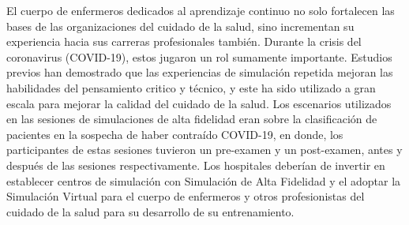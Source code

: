 El cuerpo de enfermeros dedicados al aprendizaje continuo no solo fortalecen las bases de las organizaciones del cuidado de la salud, sino incrementan su experiencia hacia sus carreras profesionales también. Durante la crisis del coronavirus (COVID-19), estos jugaron un rol sumamente importante. Estudios previos han demostrado que las experiencias de simulación repetida mejoran las habilidades del pensamiento critico y técnico, y este ha sido utilizado a gran escala para mejorar la calidad del cuidado de la salud. Los escenarios utilizados en las sesiones de simulaciones de alta fidelidad eran sobre la clasificación de pacientes en la sospecha de haber contraído COVID-19, en donde, los participantes de estas sesiones tuvieron un pre-examen y un post-examen, antes y después de las sesiones respectivamente. Los hospitales deberían de invertir en establecer centros de simulación con Simulación de Alta Fidelidad y el adoptar la Simulación Virtual para el cuerpo de enfermeros y otros profesionistas del cuidado de la salud para su desarrollo de su entrenamiento. \parencite{GUERRERO2022100002}


